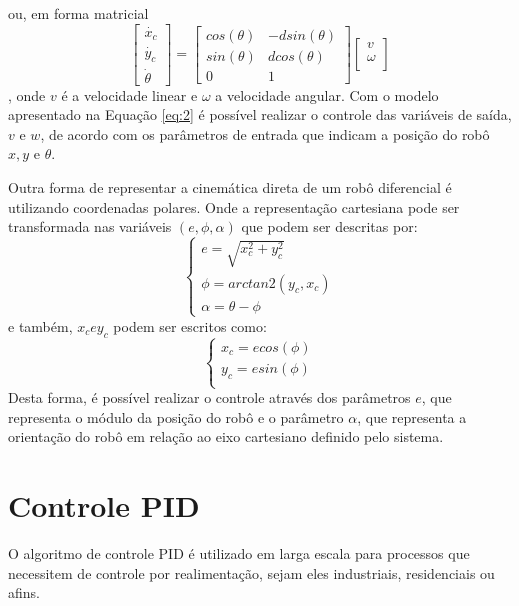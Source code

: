 ou, em forma matricial
\begin{equation}
    \begin{bmatrix}
       \dot{x_{c}} \\
       \dot{y_{c}} \\
       \dot{\theta}
     \end{bmatrix} = \begin{bmatrix}
       cos(\theta) & -dsin(\theta)\\
        sin(\theta) & dcos(\theta)\\
       0 & 1
     \end{bmatrix}\begin{bmatrix}
       v\\
       \omega\\
     \end{bmatrix}
     \label{eq:2}
\end{equation},
onde $v$ é a velocidade linear e $\omega$ a velocidade angular. \cite{sousa2003controle}
Com o modelo apresentado na Equação \ref{eq:2} é possível realizar o controle das variáveis de saída, $v$ e $w$, de acordo com os parâmetros de entrada que indicam a posição do robô $x, y$ e $\theta$.
\par
Outra forma de representar a cinemática direta de um robô diferencial é utilizando coordenadas polares. \cite{aicardi1995closed} Onde a representação cartesiana pode ser transformada nas variáveis $(e, \phi, \alpha)$ que podem ser descritas por:
\begin{equation}
  \begin{cases}
     e = \sqrt{x_{c}^2 + y_{c}^2}\\
     \phi = arctan2(y_{c},x_{c})\\
     \alpha = \theta - \phi
  \end{cases}
  \label{eq:3}
\end{equation}
e também, $x_{c} e y_{c}$ podem ser escritos como:
\begin{equation}
  \begin{cases}
     x_{c} = e cos(\phi)\\
     y_{c} = esin(\phi)\\
  \end{cases}
  \label{eq:4}
\end{equation}
Desta forma, é possível realizar o controle através dos parâmetros $e$, que representa o módulo da posição do robô e o parâmetro $\alpha$, que representa a orientação do robô em relação ao eixo cartesiano definido pelo sistema.
\section{Controle PID}
O algoritmo de controle PID é utilizado em larga escala para processos que necessitem de controle por realimentação, sejam eles industriais, residenciais ou afins. \cite{astrom1995}
\par
